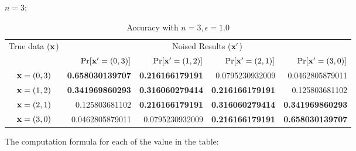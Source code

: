 \documentclass{article}
\begin{document}
\newpage
$n = 3:$
\begin{table}[htbp]
	\vspace{-0.5cm}

	\footnotesize
	\centering
	\caption{Accuracy with $n = 3, \epsilon = 1.0$}
	\label{tab_n3prob}
\begin{tabular}{|c||r|r|r|r|}
	\hline

	\multirow{2}{*}{True data ($\textbf{x}$)}
								& \multicolumn{4}{c|}{Noised Results ($\textbf{x}'$)}  
								\\ \cline{2-5}
	                      		&  $\Pr[\textbf{x}' = (0, 3)]$  	
	                      		&  $\Pr[\textbf{x}' = (1, 2)]$ 	
	                      		&  $\Pr[\textbf{x}' = (2, 1)]$ 	
	                      		&  $\Pr[\textbf{x}' = (3, 0)]$ 	
	                      		\\  \hline
	                      		\hline
	$\textbf{x} = (0,3)$          & {\bf 0.658030139707}	
								& {\bf 0.216166179191}	
								&  0.0795230932009
								&  0.0462805879011
								\\  \hline
	$\textbf{x} = (1,2)$          & {\bf 0.341969860293}	
								& {\bf 0.316060279414}			
								& {\bf 0.216166179191}
								&  0.125803681102
								\\  \hline
	$\textbf{x} = (2,1)$          & 0.125803681102
								& {\bf 0.216166179191}			
								& {\bf 0.316060279414}
								& {\bf 0.341969860293} 
								\\  \hline
	$\textbf{x} = (3,0)$          & 0.0462805879011
								& 0.0795230932009 			
								& {\bf 0.216166179191}
								& {\bf 0.658030139707} 
								\\  \hline
\end{tabular}
\end{table}


The computation formula for each of the value in the table:
\end{document}
